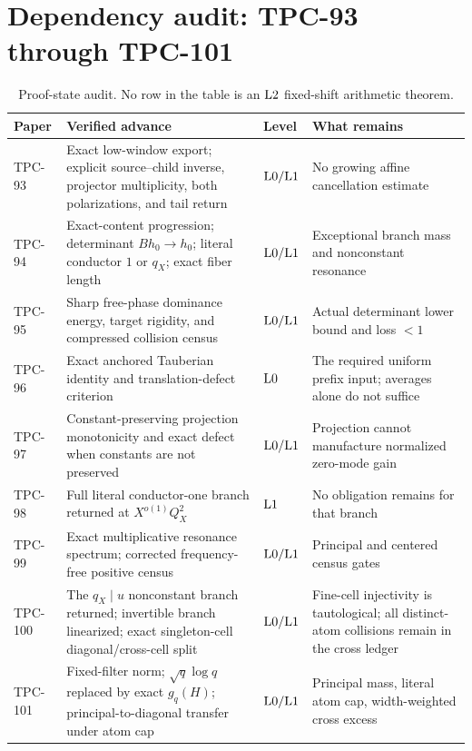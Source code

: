 \section{Dependency audit: TPC-93 through TPC-101}
\label{sec:dependency-audit}

\begin{table}[ht]
\centering
\small
\begin{tabularx}{\textwidth}{@{}
 >{\raggedright\arraybackslash}p{}
 >{\raggedright\arraybackslash}p{}
 >{\raggedright\arraybackslash}p{}
 >{\raggedright\arraybackslash}X@{}}
\toprule
Paper & Verified advance & Level & What remains\\
\midrule
TPC-93 &
Exact low-window export; explicit source--child inverse,
projector multiplicity, both polarizations, and tail return &
\(\mathrm{L0}/\mathrm{L1}\) &
No growing affine cancellation estimate
\\
TPC-94 &
Exact-content progression; determinant \(Bh_0\to h_0\);
literal conductor \(1\) or \(q_X\); exact fiber length &
\(\mathrm{L0}/\mathrm{L1}\) &
Exceptional branch mass and nonconstant resonance
\\
TPC-95 &
Sharp free-phase dominance energy, target rigidity, and compressed
collision census &
\(\mathrm{L0}/\mathrm{L1}\) &
Actual determinant lower bound and loss \(<1\)
\\
TPC-96 &
Exact anchored Tauberian identity and translation-defect criterion &
\(\mathrm{L0}\) &
The required uniform prefix input; averages alone do not suffice
\\
TPC-97 &
Constant-preserving projection monotonicity and exact defect when
constants are not preserved &
\(\mathrm{L0}/\mathrm{L1}\) &
Projection cannot manufacture normalized zero-mode gain
\\
TPC-98 &
Full literal conductor-one branch returned at
\(X^{o(1)}Q_X^2\) &
\(\mathrm{L1}\) &
No obligation remains for that branch
\\
TPC-99 &
Exact multiplicative resonance spectrum; corrected
frequency-free positive census &
\(\mathrm{L0}/\mathrm{L1}\) &
Principal and centered census gates
\\
TPC-100 &
The \(q_X\mid u\) nonconstant branch returned; invertible branch
linearized; exact singleton-cell diagonal/cross-cell split &
\(\mathrm{L0}/\mathrm{L1}\) &
Fine-cell injectivity is tautological; all distinct-atom
collisions remain in the cross ledger
\\
TPC-101 &
Fixed-filter norm; \(\sqrt q\log q\) replaced by exact
\(g_q(H)\); principal-to-diagonal transfer under atom cap &
\(\mathrm{L0}/\mathrm{L1}\) &
Principal mass, literal atom cap, width-weighted cross excess
\\
\bottomrule
\end{tabularx}
\caption{Proof-state audit.  No row in the table is an \(\mathrm{L2}\)
fixed-shift arithmetic theorem.}
\label{tab:dependency-audit}
\end{table}

